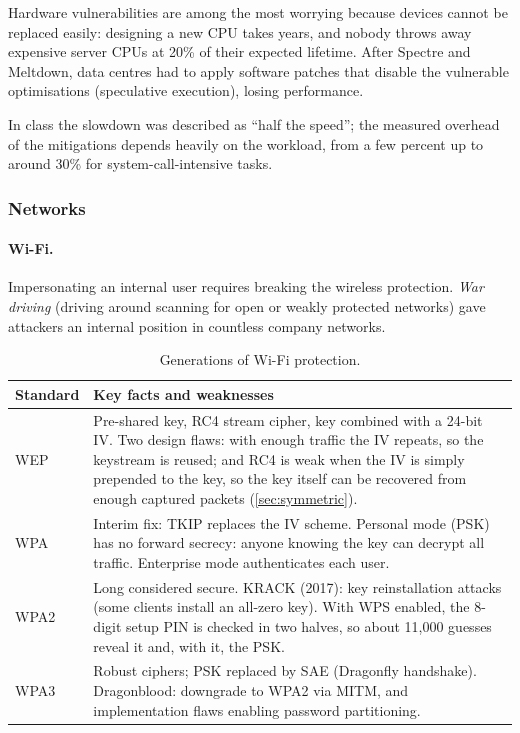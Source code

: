 Hardware vulnerabilities are among the most worrying because devices cannot be replaced easily: designing a new CPU takes years, and nobody throws away expensive server CPUs at 20\% of their expected lifetime. After Spectre and Meltdown, data centres had to apply software patches that disable the vulnerable optimisations (speculative execution), losing performance.

\begin{remark}
In class the slowdown was described as \enquote{half the speed}; the measured overhead of the mitigations depends heavily on the workload, from a few percent up to around 30\% for system-call-intensive tasks.
\end{remark}

\subsubsection{Networks}

\paragraph{Wi-Fi.} Impersonating an internal user requires breaking the wireless protection. \emph{War driving} (driving around scanning for open or weakly protected networks) gave attackers an internal position in countless company networks.

\begin{table}[H]
\centering
\caption{Generations of Wi-Fi protection.}
\label{tab:wifi}
\begin{tabularx}{\textwidth}{@{}l X@{}}
\toprule
Standard & Key facts and weaknesses \\
\midrule
WEP  & Pre-shared key, RC4 stream cipher, key combined with a 24-bit IV. Two design flaws: with enough traffic the IV repeats, so the keystream is reused; and RC4 is weak when the IV is simply prepended to the key, so the key itself can be recovered from enough captured packets (\cref{sec:symmetric}). \\
WPA  & Interim fix: TKIP replaces the IV scheme. Personal mode (PSK) has no forward secrecy: anyone knowing the key can decrypt all traffic. Enterprise mode authenticates each user. \\
WPA2 & Long considered secure. KRACK (2017): key reinstallation attacks (some clients install an all-zero key). With WPS enabled, the 8-digit setup PIN is checked in two halves, so about 11{,}000 guesses reveal it and, with it, the PSK. \\
WPA3 & Robust ciphers; PSK replaced by SAE (Dragonfly handshake). Dragonblood: downgrade to WPA2 via MITM, and implementation flaws enabling password partitioning. \\
\bottomrule
\end{tabularx}
\end{table}

